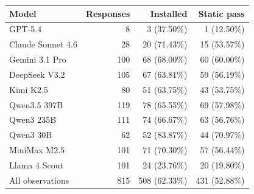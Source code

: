 \begin{tableorg}[!htbp]
\centering\small
\renewcommand{\tablecaptionfont}{\fontsize{9}{11}\selectfont}
\caption{Recovery of selected installation failures with code and direct package membership fixed.
Each model's denominator is its number of selected \myso responses.
``All observations'' sums counts before computing percentages.}
\label{tab:neighbor_recovery}
\setlength{\tabcolsep}{4pt}
\renewcommand{\arraystretch}{1.15}
\begin{tabular}{@{}lrrr@{}}
\toprule
\textbf{Model} & \textbf{Responses} & \textbf{Installed} & \textbf{Static pass} \\
\midrule
GPT-5.4 & 8 & 3 (37.50\%) & 1 (12.50\%) \\
Claude Sonnet 4.6 & 28 & 20 (71.43\%) & 15 (53.57\%) \\
Gemini 3.1 Pro & 100 & 68 (68.00\%) & 60 (60.00\%) \\
DeepSeek V3.2 & 105 & 67 (63.81\%) & 59 (56.19\%) \\
Kimi K2.5 & 80 & 51 (63.75\%) & 43 (53.75\%) \\
Qwen3.5 397B & 119 & 78 (65.55\%) & 69 (57.98\%) \\
Qwen3 235B & 111 & 74 (66.67\%) & 63 (56.76\%) \\
Qwen3 30B & 62 & 52 (83.87\%) & 44 (70.97\%) \\
MiniMax M2.5 & 101 & 71 (70.30\%) & 57 (56.44\%) \\
Llama 4 Scout & 101 & 24 (23.76\%) & 20 (19.80\%) \\
All observations & 815 & 508 (62.33\%) & 431 (52.88\%) \\
\bottomrule
\end{tabular}
\end{tableorg}
